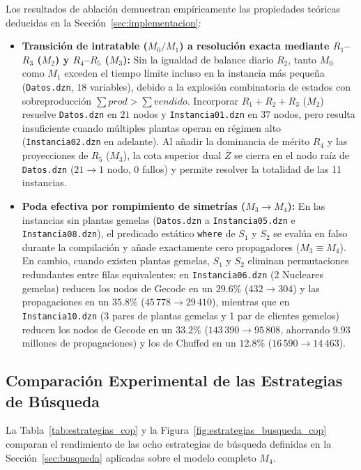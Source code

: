 Los resultados de ablación demuestran empíricamente las propiedades teóricas deducidas en la Sección~\ref{sec:implementacion}:
\begin{itemize}
    \item \textbf{Transición de intratable ($M_0/M_1$) a resolución exacta mediante $R_1$--$R_3$ ($M_2$) y $R_4$--$R_5$ ($M_3$):} Sin la igualdad de balance diario $R_2$, tanto $M_0$ como $M_1$ exceden el tiempo límite incluso en la instancia más pequeña (\texttt{Datos.dzn}, $18$ variables), debido a la explosión combinatoria de estados con sobreproducción $\sum prod > \sum vendido$. Incorporar $R_1+R_2+R_3$ ($M_2$) resuelve \texttt{Datos.dzn} en $21$ nodos y \texttt{Instancia01.dzn} en $37$ nodos, pero resulta insuficiente cuando múltiples plantas operan en régimen alto (\texttt{Instancia02.dzn} en adelante). Al añadir la dominancia de mérito $R_4$ y las proyecciones de $R_5$ ($M_3$), la cota superior dual $\overline{Z}$ se cierra en el nodo raíz de \texttt{Datos.dzn} ($21 \to 1$ nodo, $0$ fallos) y permite resolver la totalidad de las 11 instancias.
    \item \textbf{Poda efectiva por rompimiento de simetrías ($M_3 \to M_4$):} En las instancias sin plantas gemelas (\texttt{Datos.dzn} a \texttt{Instancia05.dzn} e \texttt{Instancia08.dzn}), el predicado estático \texttt{where} de $S_1$ y $S_2$ se evalúa en falso durante la compilación y añade exactamente cero propagadores ($M_3 \equiv M_4$). En cambio, cuando existen plantas gemelas, $S_1$ y $S_2$ eliminan permutaciones redundantes entre filas equivalentes: en \texttt{Instancia06.dzn} (2 Nucleares gemelas) reducen los nodos de Gecode en un \textbf{$29.6\%$} ($432 \to 304$) y las propagaciones en un \textbf{$35.8\%$} ($45\,778 \to 29\,410$), mientras que en \texttt{Instancia10.dzn} (3 pares de plantas gemelas y 1 par de clientes gemelos) reducen los nodos de Gecode en un \textbf{$33.2\%$} ($143\,390 \to 95\,808$, ahorrando $9.93$ millones de propagaciones) y los de Chuffed en un \textbf{$12.8\%$} ($16\,590 \to 14\,463$).
\end{itemize}

\subsection{Comparación Experimental de las Estrategias de Búsqueda}

La Tabla~\ref{tab:estrategias_cop} y la Figura~\ref{fig:estrategias_busqueda_cop} comparan el rendimiento de las ocho estrategias de búsqueda definidas en la Sección~\ref{sec:busqueda} aplicadas sobre el modelo completo $M_4$.


